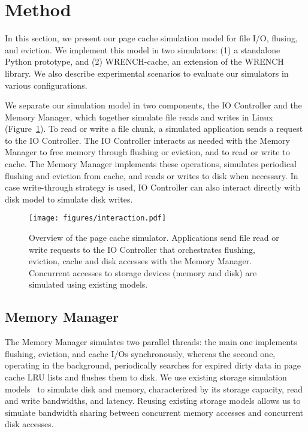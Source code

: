 \documentclass[conference]{IEEEtran}
\begin{document}
    \section{Method}
    \label{method}
    In this section, we present our page cache simulation model for file I/O,
    flusing, and eviction. We implement this model in two simulators:
    (1) a standalone Python prototype, and (2) WRENCH-cache, an extension of the WRENCH library.
    We also describe experimental scenarios to evaluate our simulators in various configurations.
     
    We separate our simulation model in two components, the IO
    Controller and the Memory Manager, which together simulate 
    file reads and writes in Linux (Figure~\ref{fig:interaction}). 
    To read or write a file chunk, a simulated application sends a
    request to the IO Controller. The IO Controller interacts as needed with
    the Memory Manager to free memory through flushing or eviction,
    and to read or write to cache. The Memory Manager
    implements these operations, simulates periodical flushing
    and eviction from cache, and reads or writes to disk when necessary.  
    In case write-through strategy is used, IO Controller can also interact directly 
    with disk model to simulate disk writes.
    
    \begin{figure}
           \centering
           \texttt{[image: figures/interaction.pdf]}
           \caption{Overview of the page cache simulator.
           Applications send file read or write requests to the
           IO Controller that orchestrates flushing, eviction, cache
           and disk accesses with the Memory Manager. Concurrent accesses to storage
           devices (memory and disk) are simulated using existing models.}
           \label{fig:interaction}
    \end{figure}

    \subsection{Memory Manager}

    The Memory Manager simulates two parallel threads: the main one
    implements flushing, eviction, and cache I/Os synchronously, whereas
    the second one, operating in the background, periodically searches for
    expired dirty data in page cache LRU lists and flushes them to disk. We
    use existing storage simulation models~\cite{lebre2015} to simulate disk and
    memory, characterized by its storage capacity, read and write
    bandwidths, and latency. Reusing existing storage models allows us to
    simulate bandwidth sharing between concurrent memory accesses and concurrent disk accesses.
\end{document}
